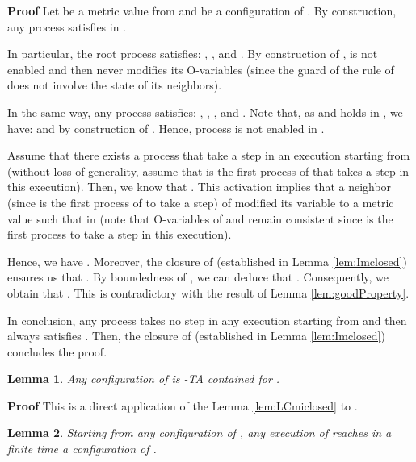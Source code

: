 \documentclass[11pt]{article}
\newenvironment{proof}{\noindent\textbf{Proof}}{\hfill\qed}
\newcommand{\qed}{\hfill}
\newtheorem{lem}{Lemma}
\newenvironment{lemma}[1]{\vspace{-0.25cm}\begin{lem}#1}{\end{lem}\vspace{-0.3cm}}
\begin{document}
\begin{proof}
Let  be a metric value from  and  be a configuration of . By construction, any process  satisfies  in . 

In particular, the root process satisfies: , , and . By construction of ,  is not enabled and then never modifies its O-variables (since the guard of the rule of  does not involve the state of its neighbors). 

In the same way, any process  satisfies: ,  , , and . Note that, as  and  holds in , we have:  and  by construction of . Hence, process  is not enabled in .

Assume that there exists a process  that take a step  in an execution starting from  (without loss of generality, assume that  is the first process of  that takes a step in this execution). Then, we know that . This activation implies that a neighbor  (since  is the first process of  to take a step) of  modified its  variable to a metric value  such that  in  (note that O-variables of  and  remain consistent since  is the first process to take a step in this execution).

Hence, we have . Moreover, the closure of  (established in Lemma \ref{lem:Imclosed}) ensures us that . By boundedness of , we can deduce that . Consequently, we obtain that . This is contradictory with the result of Lemma \ref{lem:goodProperty}.

In conclusion, any process  takes no step in any execution starting from  and then always satisfies . Then, the closure of  (established in Lemma \ref{lem:Imclosed}) concludes the proof.
\end{proof}

\begin{lemma}\label{lem:SBTAcontainedMax}
Any configuration of  is -TA contained for .
\end{lemma}

\begin{proof}
This is a direct application of the Lemma \ref{lem:LCmiclosed} to .
\end{proof}

\begin{lemma}\label{lem:CtoLCmr}
Starting from any configuration of , any execution of  reaches in a finite time a configuration of .
\end{lemma}
\end{document}
